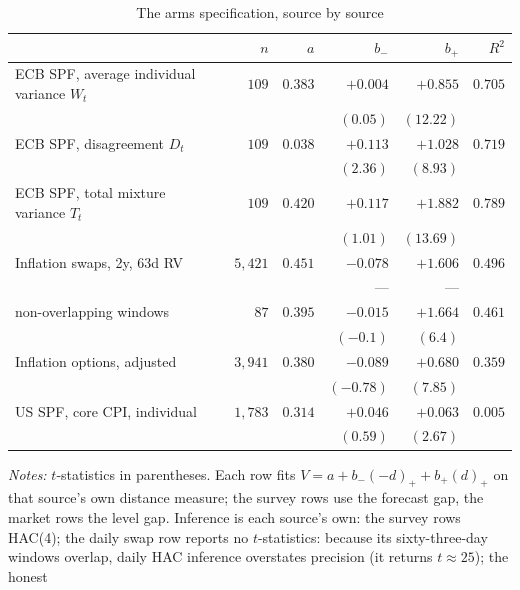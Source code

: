 \begin{table}[!htbp]\centering
\caption{The arms specification, source by source}
\label{tab:armsbysource}
\begin{tabular}{lrrrrr}
\toprule
 & $n$ & $a$ & $b_-$ & $b_+$ & $R^2$ \\
\midrule
ECB SPF, average individual variance $W_t$ & $109$ & $0.383$ & $+0.004$ & $+0.855$ & $0.705$ \\
                              &         &         & $(0.05)$ & $(12.22)$ &        \\
ECB SPF, disagreement $D_t$   & $109$   & $0.038$ & $+0.113$ & $+1.028$ & $0.719$ \\
                              &         &         & $(2.36)$ & $(8.93)$ &        \\
ECB SPF, total mixture variance $T_t$ & $109$ & $0.420$ & $+0.117$ & $+1.882$ & $0.789$ \\
                              &         &         & $(1.01)$ & $(13.69)$ &        \\
Inflation swaps, 2y, 63d RV   & $5{,}421$ & $0.451$ & $-0.078$ & $+1.606$ & $0.496$ \\
                              &         &         & --- & --- &        \\
\quad non-overlapping windows & $87$ & $0.395$ & $-0.015$ & $+1.664$ & $0.461$ \\
                              &         &         & $(-0.1)$ & $(6.4)$ &        \\
Inflation options, adjusted   & $3{,}941$ & $0.380$ & $-0.089$ & $+0.680$ & $0.359$ \\
                              &         &         & $(-0.78)$ & $(7.85)$ &         \\
US SPF, core CPI, individual  & $1{,}783$ & $0.314$ & $+0.046$ & $+0.063$ & $0.005$ \\
                              &         &         & $(0.59)$ & $(2.67)$ &          \\
\bottomrule
\end{tabular}
\vspace{0.3em}
\parbox{\linewidth}{\footnotesize \textit{Notes:} $t$-statistics in parentheses.
Each row fits $V=a+b_-(-d)_++b_+(d)_+$ on that source's own distance measure; the survey
rows use the forecast gap, the market rows the level gap. Inference is each source's own:
the survey rows HAC(4); the daily swap row reports no $t$-statistics: because its sixty-three-day windows
overlap, daily HAC inference overstates precision (it returns $t\approx25$); the honest
}
\end{table}
